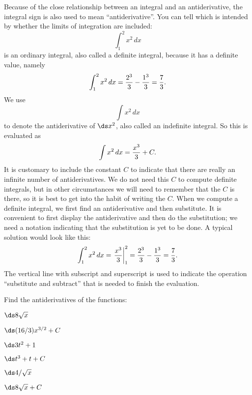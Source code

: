 \begin{theorem}
Because of the close relationship between an integral and an
antiderivative, the integral sign is also used to mean
``antiderivative''. You can tell which is intended by whether the
limits of integration are included:
$$
  \int_1^2 x^2\,dx
$$
is an ordinary integral, also called a 
{\dfont definite integral\/},
because it has a definite value, namely
$$
  \int_1^2 x^2\,dx={2^3\over3}-{1^3\over3}={7\over3}.
$$
We use
$$
  \int x^2\,dx
$$
to denote the antiderivative of $\ds x^2$, also called an
{\dfont indefinite integral\/}.
So this is evaluated as
$$
  \int x^2\,dx = {x^3\over 3}+C.
$$
It is customary to include the constant $C$ to indicate that there are
really an infinite number of antiderivatives. We do not need this $C$
to compute definite integrals, but in other circumstances we will need
to remember that the $C$ is there, so it is best to get into the habit
of writing the $C$.
When we compute a definite integral, we first find an antiderivative
and then substitute. It is convenient to first display the
antiderivative and then do the substitution; we need a notation
indicating that the substitution is yet to be done. A typical solution
would look like this:
$$
  \int_1^2 x^2\,dx=\left.{x^3\over 3}\right|_1^2 = 
  {2^3\over3}-{1^3\over3}={7\over3}.
$$
The vertical line with subscript and superscript is used to indicate
the operation ``substitute and subtract'' that is needed to finish the
evaluation. 

\begin{exercises}

Find the antiderivatives of the functions:

\twocol

\begin{exercise} $\ds 8\sqrt{x}$
\begin{answer} $\ds (16/3)x^{3/2}+C$
\end{answer}\end{exercise}

\begin{exercise} $\ds 3t^2+1$
\begin{answer} $\ds t^3+t+C$
\end{answer}\end{exercise}

\begin{exercise} $\ds 4/\sqrt{x}$
\begin{answer} $\ds 8\sqrt{x}+C$
\end{answer}\end{exercise}


\end{exercises}
\end{theorem}
